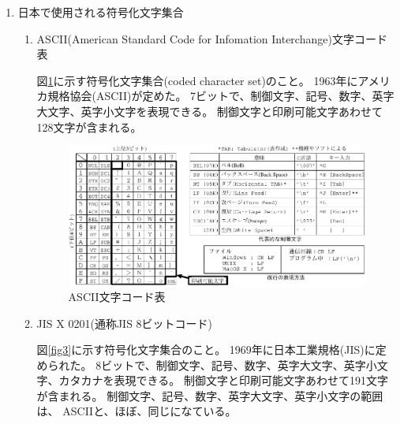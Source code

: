 \documentclass[a4j,dvipdfmx]{jarticle}
\begin{document}
\begin{enumerate}
\newpage

\item 日本で使用される符号化文字集合

\begin{enumerate}
\item ASCII(American Standard Code for Infomation Interchange)文字コード表

図\ref{fig2}に示す符号化文字集合(coded character set)のこと。
1963年にアメリカ規格協会(ASCII)が定めた。
7ビットで、制御文字、記号、数字、英字大文字、英字小文字を表現できる。
制御文字と印刷可能文字あわせて128文字が含まれる。

\begin{figure}[hbtp]
\begin{center}
\includegraphics[scale=0.9]{ascii.pdf}
\caption{ASCII文字コード表}
\label{fig2}
\end{center}
\end{figure}

\item JIS X 0201(通称JIS 8ビットコード)

図\ref{fig3}に示す符号化文字集合のこと。
1969年に日本工業規格(JIS)に定められた。
8ビットで、制御文字、記号、数字、英字大文字、英字小文字、カタカナを表現できる。
制御文字と印刷可能文字あわせて191文字が含まれる。
制御文字、記号、数字、英字大文字、英字小文字の範囲は、
ASCIIと、ほぼ、同じになている。


\end{enumerate}
\end{enumerate}
\end{document}
